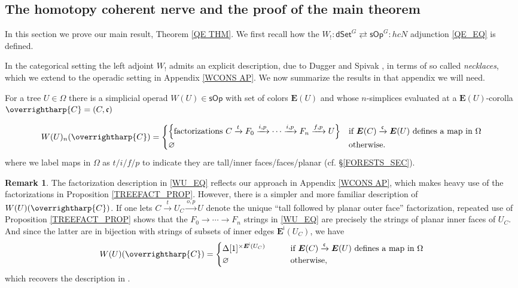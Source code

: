 \documentclass[a4paper,10pt
,draft
]{article}%
\numberwithin{equation}{section}
\numberwithin{figure}{section}
\theoremstyle{definition} %
\newtheorem{remark}[equation]{Remark}%
\newcommand{\vect}[1]{\text{\overrightharp{\ensuremath{#1}}}}
\newcommand{\1}{\ensuremath{\mathbbm 1}}%
\begin{document}
\subsection{The homotopy coherent nerve and the proof of the main theorem}
\label{PFMNTHM SEC}


In this section we prove our main result,
Theorem \ref{QE THM}.
We first recall how the
$W_!\colon \mathsf{dSet}^G 
\rightleftarrows 
\mathsf{sOp}^G \colon hcN$
adjunction \eqref{QE_EQ} is defined.

In the categorical setting
the left adjoint $W_!$ admits 
an explicit description, due to Dugger and Spivak \cite{DS11},
in terms of so called \emph{necklaces},
which we extend to the operadic setting in 
Appendix \ref{WCONS AP}.
We now summarize the results in that appendix we will need.



For a tree $U \in \Omega$ there is 
a simplicial operad
$W(U) \in \mathsf{sOp}$
with set of colors $\boldsymbol{E}(U)$
and whose $n$-simplices evaluated at
a $\boldsymbol{E}(U)$-corolla
$\vect{C} = (C,\mathfrak{c})$


\begin{equation}\label{WU_EQ}
	W(U)_n(\vect C) =
	\begin{cases}
	\left\{\text{factorizations }
	C \xrightarrow{t} 
	F_0 \xrightarrow{i,p} 
	\cdots \xrightarrow{i,p}
	F_n \xrightarrow{f,p} U
	\right\}
&
	\mbox{if $\boldsymbol{E}(C) \xrightarrow{\mathfrak{c}} \boldsymbol{E}(U)$ defines a map in $\Omega$}
\\
	\varnothing
&
	\mbox{otherwise.}
\end{cases}
\end{equation}
where we label maps in $\Omega$ as
$t/i/f/p$
to indicate they are 
tall/inner faces/faces/planar
(cf. \S \ref{FORESTS_SEC}).


\begin{remark}
	The factorization description in \eqref{WU_EQ}
	reflects our approach in Appendix \ref{WCONS AP},
	which makes heavy use of the factorizations in 
	Proposition \ref{TREEFACT_PROP}.
	However, there is a simpler and more familiar description of $W(U)(\vect{C})$.
	If one lets
	$C \xrightarrow{t} U_C \xrightarrow{o,p} U$
	denote the unique ``tall followed by planar outer face'' factorization, 
	repeated use of Proposition \ref{TREEFACT_PROP}
	shows that the 
	$F_0 \to \cdots \to F_n$
	strings in \eqref{WU_EQ}
	are precisely the strings of planar inner faces of $U_C$.
	And since the latter are in bijection with strings of subsets of inner edges $\boldsymbol{E}^{\mathsf{i}}(U_C)$, 
	we have 
\begin{equation}\label{WU_EQ2}
	W(U)(\vect C) =
	\begin{cases}
	\Delta[1]^{\times \boldsymbol{E}^{\mathsf{i}}(U_{C})}
	\qquad
&
	\mbox{if $\boldsymbol{E}(C) \xrightarrow{\mathfrak{c}} \boldsymbol{E}(U)$ defines a map in $\Omega$}
\\
\varnothing
&
	\mbox{otherwise,}
	\end{cases}
\end{equation}
which recovers the description in \cite[\S 4]{CM13b}.
\end{remark}
\end{document}
